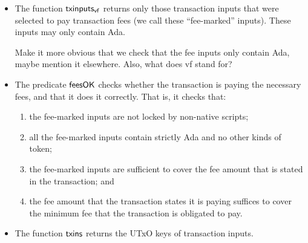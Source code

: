 \begin{itemize}
  \item The function $\mathsf{txinputs_{vf}}$ returns only those transaction inputs
    that were selected to pay transaction fees (we call these ``fee-marked'' inputs).
    These inputs may only contain Ada.
    \begin{note}
      Make it more obvious that we check that the fee inputs only contain Ada, maybe mention it elsewhere. Also, what does vf stand for?
    \end{note}
  \item The predicate $\mathsf{feesOK}$ checks whether the transaction is
  paying the necessary fees, and that it does it correctly. That is, it checks that:
  \begin{enumerate}[label=({\roman*})]
    \item the fee-marked inputs are not locked by non-native scripts;
    \item all the fee-marked inputs contain strictly Ada and no other kinds of token;
    \item the fee-marked inputs are sufficient to cover the fee amount that is stated
    in the transaction; and
    \item the fee amount that the transaction states it is paying suffices to cover
    the minimum fee that the transaction is obligated to pay.
  \end{enumerate}
  \item The function $\mathsf{txins}$ returns the UTxO keys of transaction inputs.
\end{itemize}

